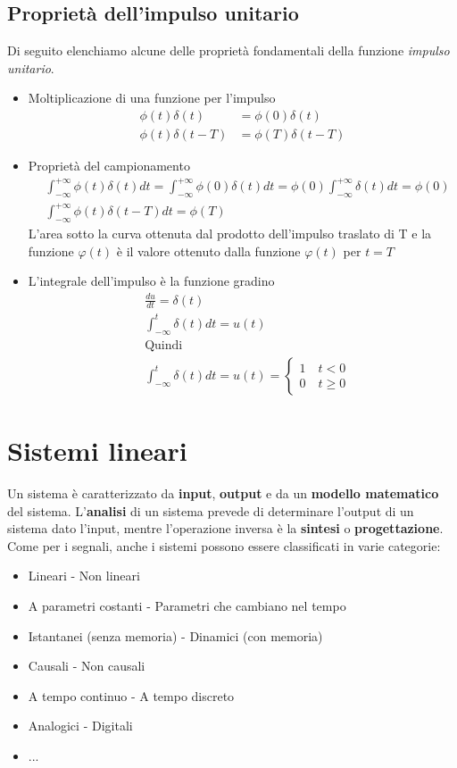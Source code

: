 \documentclass[a4paper, titlepage, oneside]{scrbook}
\begin{document}
\subsection{Proprietà dell'impulso unitario}
Di seguito elenchiamo alcune delle proprietà fondamentali della funzione \textit{impulso unitario}.
\begin{itemize}
	\item Moltiplicazione di una funzione per l'impulso
	\begin{align*}
	\phi(t)\delta(t)&=\phi(0)\delta(t)\\
	\phi(t)\delta(t-T)&=\phi(T)\delta(t-T)
	\end{align*}
	
	\item Proprietà del campionamento
	\begin{align*}
	&\int_{-\infty}^{+\infty} \phi(t)\delta(t)dt=\int_{-\infty}^{+\infty} \phi(0)\delta(t)dt=\phi(0)\int_{-\infty}^{+\infty} \delta(t)dt=\phi(0)\\
	&\int_{-\infty}^{+\infty} \phi(t)\delta(t-T)dt=\phi(T)
	\end{align*}
	L'area sotto la curva ottenuta dal prodotto dell'impulso traslato di T e la funzione $\varphi(t)$ è il valore ottenuto dalla funzione $\varphi(t)$ per $t=T$
	
	\item L'integrale dell'impulso è la funzione gradino
	\begin{align*}
		&\frac{du}{dt}=\delta(t)\\
		&\int_{-\infty}^{t}\delta(t)dt=u(t)\\
		&\text{Quindi}\\
		&\int_{-\infty}^{t}\delta(t)dt=u(t)=
		\left\{
		\begin{array}{ll}
		1 \quad t<0\\
		0 \quad t\geq0
		\end{array}
		\right.
	\end{align*}
\end{itemize}

\section{Sistemi lineari}
Un sistema è caratterizzato da \textbf{input}, \textbf{output} e da un \textbf{modello matematico} del sistema. L'\textbf{analisi} di un sistema prevede di determinare l'output di un sistema dato l'input, mentre l'operazione inversa è la \textbf{sintesi} o \textbf{progettazione}.
Come per i segnali, anche i sistemi possono essere classificati in varie categorie:
\begin{itemize}
	\item Lineari - Non lineari
	\item A parametri costanti - Parametri che cambiano nel tempo
	\item Istantanei (senza memoria) - Dinamici (con memoria)
	\item Causali - Non causali
	\item A tempo continuo - A tempo discreto
	\item Analogici - Digitali
	\item ...
\end{itemize}
\end{document}
